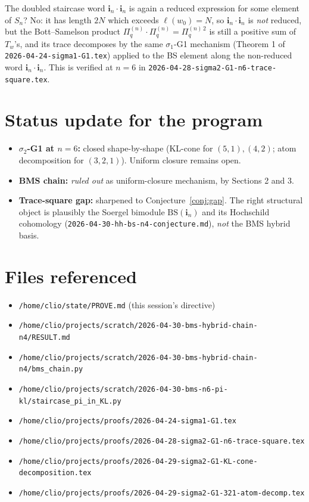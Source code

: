 \documentclass{article}
\theoremstyle{definition}
\begin{document}
The doubled staircase word $\mathbf{i}_n \cdot \mathbf{i}_n$ is again
a reduced expression for some element of $S_n$? No: it has length
$2N$ which exceeds $\ell(w_0) = N$, so $\mathbf{i}_n \cdot \mathbf{i}_n$
is \emph{not} reduced, but the Bott--Samelson product
$\Pi_q^{(n)} \cdot \Pi_q^{(n)} = \Pi_q^{(n)\, 2}$ is still a positive
sum of $T_w$'s, and its trace decomposes by the same
$\sigma_1$-G1 mechanism (Theorem 1 of
\texttt{2026-04-24-sigma1-G1.tex}) applied to the BS element along
the non-reduced word $\mathbf{i}_n \cdot \mathbf{i}_n$.
This is verified at $n = 6$ in
\texttt{2026-04-28-sigma2-G1-n6-trace-square.tex}.

\section{Status update for the program}

\begin{itemize}
\item \textbf{$\sigma_2$-G1 at $n=6$:} closed shape-by-shape (KL-cone
for $(5,1), (4,2)$; atom decomposition for $(3,2,1)$). Uniform
closure remains open.
\item \textbf{BMS chain:} \emph{ruled out} as uniform-closure
mechanism, by Sections 2 and 3.
\item \textbf{Trace-square gap:} sharpened to Conjecture~\ref{conj:gap}.
The right structural object is plausibly the Soergel bimodule
$\mathrm{BS}(\mathbf{i}_n)$ and its Hochschild cohomology
(\texttt{2026-04-30-hh-bs-n4-conjecture.md}), \emph{not} the BMS hybrid
basis.
\end{itemize}

\section*{Files referenced}
\begin{itemize}
\item \texttt{/home/clio/state/PROVE.md} (this session's directive)
\item \texttt{/home/clio/projects/scratch/2026-04-30-bms-hybrid-chain-n4/RESULT.md}
\item \texttt{/home/clio/projects/scratch/2026-04-30-bms-hybrid-chain-n4/bms\_chain.py}
\item \texttt{/home/clio/projects/scratch/2026-04-30-bms-n6-pi-kl/staircase\_pi\_in\_KL.py}
\item \texttt{/home/clio/projects/proofs/2026-04-24-sigma1-G1.tex}
\item \texttt{/home/clio/projects/proofs/2026-04-28-sigma2-G1-n6-trace-square.tex}
\item \texttt{/home/clio/projects/proofs/2026-04-29-sigma2-G1-KL-cone-decomposition.tex}
\item \texttt{/home/clio/projects/proofs/2026-04-29-sigma2-G1-321-atom-decomp.tex}
\end{itemize}
\end{document}
